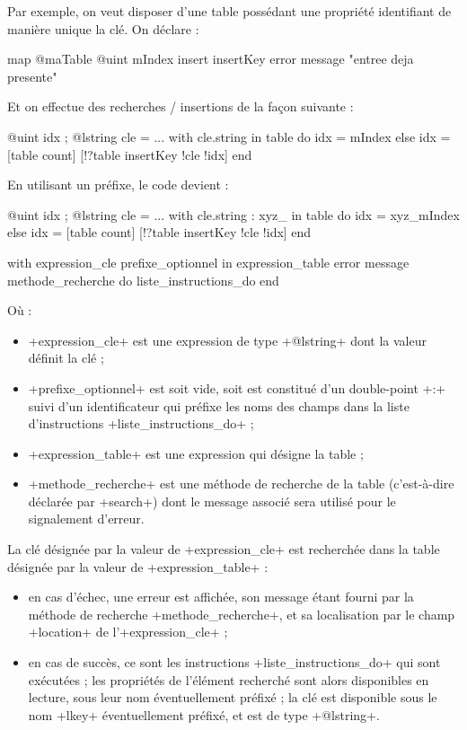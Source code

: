 Par exemple, on veut disposer d'une table possédant une propriété identifiant de manière unique la clé. On déclare :
\begin{galgas}
map @maTable {
  @uint mIndex
  insert insertKey error message "entree deja presente"
}
\end{galgas}

Et on effectue des recherches / insertions de la façon suivante :
\begin{galgas}
@uint idx ;
@lstring cle = ...
with cle.string in table do
  idx = mIndex
else
  idx = [table count]
  [!?table insertKey !cle !idx]
end
\end{galgas}

En utilisant un préfixe, le code devient :
\begin{galgas}
@uint idx ;
@lstring cle = ...
with cle.string : xyz_ in table do
  idx = xyz_mIndex
else
  idx = [table count]
  [!?table insertKey !cle !idx]
end
\end{galgas}






\begin{galgas}
with expression_cle prefixe_optionnel in expression_table
error message methode_recherche
do
  liste_instructions_do
end
\end{galgas}

Où :
\begin{itemize}
  \item \ggs+expression_cle+ est une expression de type \ggs+@lstring+ dont la valeur définit la clé ;
  \item \ggs+prefixe_optionnel+ est soit vide, soit est constitué d'un double-point \ggs+:+ suivi d'un identificateur qui préfixe les noms des champs dans la liste d'instructions \ggs+liste_instructions_do+ ;
  \item \ggs+expression_table+ est une expression qui désigne la table ;
  \item \ggs+methode_recherche+ est une méthode de recherche de la table (c'est-à-dire déclarée par \ggs+search+) dont le message associé sera utilisé pour le signalement d'erreur.
\end{itemize}

La clé désignée par la valeur de \ggs+expression_cle+ est recherchée dans la table désignée par la valeur de \ggs+expression_table+ :
\begin{itemize}
  \item en cas d'échec, une erreur est affichée, son message étant fourni par la méthode de recherche \ggs+methode_recherche+, et sa localisation par le champ \ggs+location+ de l'\ggs+expression_cle+ ;
  \item en cas de succès, ce sont les instructions \ggs+liste_instructions_do+ qui sont exécutées ; les propriétés de l'élément recherché sont alors disponibles en lecture, sous leur nom éventuellement préfixé ; la clé est disponible sous le nom \ggs+lkey+ éventuellement préfixé, et est de type \ggs+@lstring+.
\end{itemize}

